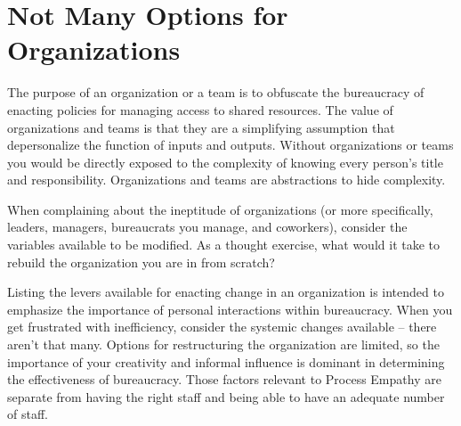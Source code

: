 \section{Not Many Options for Organizations}

The purpose of an organization or a team is to obfuscate the bureaucracy of enacting policies for managing access to shared resources. The value of organizations and teams is that they are a simplifying assumption that depersonalize the function of inputs and outputs. Without organizations or teams you would be directly exposed to the complexity of knowing every person's title and responsibility. Organizations and teams are abstractions to hide complexity.

When complaining about the ineptitude of organizations (or more specifically, leaders, managers, bureaucrats you manage, and coworkers), consider the variables available to be modified. As a thought exercise, what would it take to rebuild the organization you are in from scratch? 

Listing the levers available for enacting change in an organization is intended to emphasize the importance of personal interactions within bureaucracy. When you get frustrated with inefficiency, consider the systemic changes available -- there aren't that many. Options for restructuring the organization are limited, so the importance of your creativity and informal influence is dominant in determining the effectiveness of bureaucracy. Those factors relevant to Process Empathy are separate from having the right staff and being able to have an adequate number of staff. 

